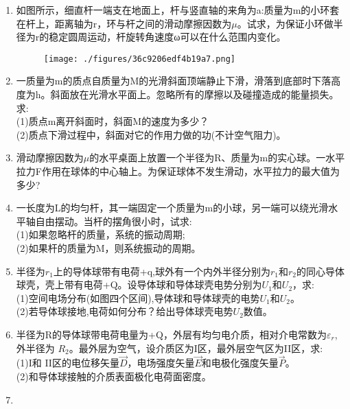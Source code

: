 \begin{enumerate}
\item 如图所示，细直杆一端支在地面上，杆与竖直轴的来角为a:质量为m的小环套在杆上，距离轴为r，环与杆之间的滑动摩擦因数为$\mu$。试求，为保证小环做半径为r的稳定圆周运动，杆旋转角速度ω可以在什么范围内变化。
\begin{figure}[ht]
\centering
\texttt{[image: ./figures/36c9206edf4b19a7.png]}
\caption{} \label{fig_SSD11_1}
\end{figure}
\item 一质量为m的质点自质量为M的光滑斜面顶端静止下滑，滑落到底部时下落高度为h。斜面放在光滑水平面上。忽略所有的摩擦以及碰撞造成的能量损失。求:\\
(1)质点m离开斜面时，斜面M的速度为多少？\\
(2)质点下滑过程中，斜面对它的作用力做的功(不计空气阻力)。
\item 滑动摩擦因数为$\mu$的水平桌面上放置一个半径为R、质量为m的实心球。一水平拉力F作用在球体的中心轴上。为保证球体不发生滑动，水平拉力的最大值为多少?
\item 一长度为L的均匀杆，其一端固定一个质量为m的小球，另一端可以绕光滑水平轴自由摆动。当杆的摆角很小时，试求:\\
(1)如果忽略杆的质量，系统的振动周期;\\
(2)如果杆的质量为M，则系统振动的周期。
\item 半径为$r_1$上的导体球带有电荷+q,球外有一个内外半径分别为$r_1$和$r_2$的同心导体球壳，壳上带有电荷+Q。设导体球和导体球壳电势分别为$U_1$和$U_2$，求:\\
(1)空间电场分布(如图四个区间),导体球和导体球壳的电势$U_1$和$U_2$。\\
(2)若导体球接地,电荷如何分布？给出导体球壳电势$U_2$数值。
\item 半径为R的导体球带电荷电量为+Q，外层有均匀电介质，相对介电常数为$\varepsilon_r$,外半径为 $R_2$。最外层为空气，设介质区为I区，最外层空气区为II区，求:\\
(1)I和 II区的电位移矢量$\vec D$，电场强度矢量$\vec E$和电极化强度矢量$\vec P$。\\
(2)和导体球接触的介质表面极化电荷面密度。
\item 
\end{enumerate}
